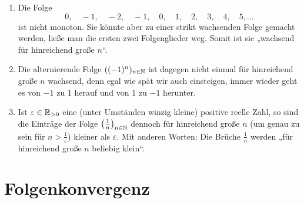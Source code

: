\begin{bsp} \label{bsp:eventually} \quad
    \begin{enumerate}
        \item Die Folge
            \[ 0,\quad -1,\quad -2,\quad -1,\quad 0,\quad 1,\quad 2,\quad 3,\quad 4, \quad 5,\dots \]
        ist nicht monoton. Sie könnte aber zu einer strikt wachsenden Folge gemacht werden, ließe man die ersten zwei Folgenglieder weg. Somit ist sie „wachsend für hinreichend große $n$“.
        \item Die alternierende Folge $((-1)^n)_{n\in \mathbb N}$ ist dagegen nicht einmal für hinreichend große $n$ wachsend, denn egal wie spät wir auch einsteigen, immer wieder geht es von $-1$ zu $1$ herauf und von $1$ zu $-1$ herunter.
        \item Ist $\varepsilon \in \mathbb R_{>0}$ eine (unter Umständen winzig kleine) positive reelle Zahl, so sind die Einträge der Folge $\left(\frac{1}{n}\right)_{n\in \mathbb N}$ dennoch für hinreichend große $n$ (um genau zu sein für $n> \frac{1}{\varepsilon}$) kleiner als $\varepsilon$. Mit anderen Worten: Die Brüche $\frac{1}{n}$ werden „für hinreichend große $n$ beliebig klein“.
    \end{enumerate}
\end{bsp}





\section{Folgenkonvergenz}


